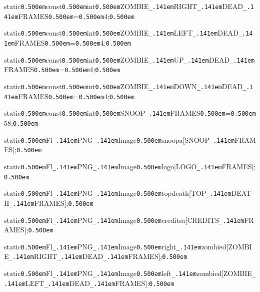 \documentclass[12pt]{article}
\begin{document}
\noindent
{}static{\tt\mc \kern0.500em}const{\tt\mc \kern0.500em}int{\tt\mc \kern0.500em}ZOMBIE{\tt\_\kern.141em}RIGHT{\tt\_\kern.141em}DEAD{\tt\_\kern.141em}FRAMES{\tt\mc \kern0.500em}={\tt\mc \kern0.500em}4;{\tt\mc \kern0.500em}

\noindent
{}static{\tt\mc \kern0.500em}const{\tt\mc \kern0.500em}int{\tt\mc \kern0.500em}ZOMBIE{\tt\_\kern.141em}LEFT{\tt\_\kern.141em}DEAD{\tt\_\kern.141em}FRAMES{\tt\mc \kern0.500em}={\tt\mc \kern0.500em}4;{\tt\mc \kern0.500em}

\noindent
{}static{\tt\mc \kern0.500em}const{\tt\mc \kern0.500em}int{\tt\mc \kern0.500em}ZOMBIE{\tt\_\kern.141em}UP{\tt\_\kern.141em}DEAD{\tt\_\kern.141em}FRAMES{\tt\mc \kern0.500em}={\tt\mc \kern0.500em}4;{\tt\mc \kern0.500em}

\noindent
{}static{\tt\mc \kern0.500em}const{\tt\mc \kern0.500em}int{\tt\mc \kern0.500em}ZOMBIE{\tt\_\kern.141em}DOWN{\tt\_\kern.141em}DEAD{\tt\_\kern.141em}FRAMES{\tt\mc \kern0.500em}={\tt\mc \kern0.500em}4;{\tt\mc \kern0.500em}

\noindent
{}static{\tt\mc \kern0.500em}const{\tt\mc \kern0.500em}int{\tt\mc \kern0.500em}SNOOP{\tt\_\kern.141em}FRAMES{\tt\mc \kern0.500em}={\tt\mc \kern0.500em}58;{\tt\mc \kern0.500em}

\noindent
{}static{\tt\mc \kern0.500em}Fl{\tt\_\kern.141em}PNG{\tt\_\kern.141em}Image{\tt *}{\tt\mc \kern0.500em}snoopa[SNOOP{\tt\_\kern.141em}FRAMES];{\tt\mc \kern0.500em}

\noindent
{}static{\tt\mc \kern0.500em}Fl{\tt\_\kern.141em}PNG{\tt\_\kern.141em}Image{\tt *}{\tt\mc \kern0.500em}logo[LOGO{\tt\_\kern.141em}FRAMES];{\tt\mc \kern0.500em}

\noindent
{}static{\tt\mc \kern0.500em}Fl{\tt\_\kern.141em}PNG{\tt\_\kern.141em}Image{\tt *}{\tt\mc \kern0.500em}topdeath[TOP{\tt\_\kern.141em}DEATH{\tt\_\kern.141em}FRAMES];{\tt\mc \kern0.500em}

\noindent
{}static{\tt\mc \kern0.500em}Fl{\tt\_\kern.141em}PNG{\tt\_\kern.141em}Image{\tt *}{\tt\mc \kern0.500em}creditsa[CREDITS{\tt\_\kern.141em}FRAMES];{\tt\mc \kern0.500em}

\noindent
{}static{\tt\mc \kern0.500em}Fl{\tt\_\kern.141em}PNG{\tt\_\kern.141em}Image{\tt *}{\tt\mc \kern0.500em}right{\tt\_\kern.141em}zombied[ZOMBIE{\tt\_\kern.141em}RIGHT{\tt\_\kern.141em}DEAD{\tt\_\kern.141em}FRAMES];{\tt\mc \kern0.500em}

\noindent
{}static{\tt\mc \kern0.500em}Fl{\tt\_\kern.141em}PNG{\tt\_\kern.141em}Image{\tt *}{\tt\mc \kern0.500em}left{\tt\_\kern.141em}zombied[ZOMBIE{\tt\_\kern.141em}LEFT{\tt\_\kern.141em}DEAD{\tt\_\kern.141em}FRAMES];{\tt\mc \kern0.500em}
\end{document}
